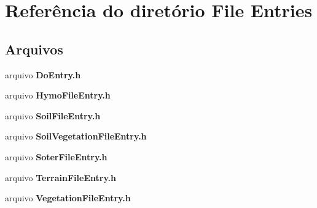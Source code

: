 \section{Referência do diretório File Entries}
\label{dir_ec7228839375aeb2765939606b0d5ff7}
\subsection*{Arquivos}
\begin{DoxyCompactItemize}
\item 
arquivo {\bf Do\+Entry.\+h}
\item 
arquivo {\bf Hymo\+File\+Entry.\+h}
\item 
arquivo {\bf Soil\+File\+Entry.\+h}
\item 
arquivo {\bf Soil\+Vegetation\+File\+Entry.\+h}
\item 
arquivo {\bf Soter\+File\+Entry.\+h}
\item 
arquivo {\bf Terrain\+File\+Entry.\+h}
\item 
arquivo {\bf Vegetation\+File\+Entry.\+h}
\end{DoxyCompactItemize}
